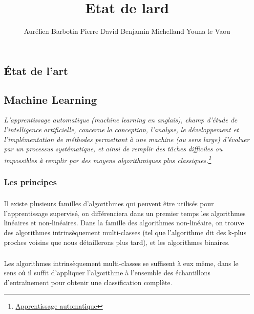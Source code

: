 \documentclass[a4paper,10pt]{report}
\begin{document}
\begin{multicols}{2}
\title{Etat de lard}
\author{Aurélien Barbotin Pierre David Benjamin Michelland Youna le Vaou}

\maketitle
\chapter{État de l'art}

\section{Machine Learning}
\textit{L'apprentissage automatique (machine learning en anglais), champ d'étude de l'intelligence artificielle, concerne la conception, l'analyse, le développement et l'implémentation de méthodes permettant à une machine (au sens large) d'évoluer par un processus systématique, et ainsi de remplir des tâches difficiles ou impossibles à remplir par des moyens algorithmiques plus classiques.\footnote{\href{https://fr.wikipedia.org/wiki/Apprentissage_automatique}{Apprentissage automatique}}}
\subsection{Les principes}
\paragraph{}
Il existe plusieurs familles d'algorithmes qui peuvent être utilisés pour l'apprentissage supervisé, on différenciera dans un premier temps les algorithmes linéaires et non-linéaires. Dans la famille des algorithmes non-linéaire, on trouve des algorithmes intrinsèquement multi-classes (tel que l'algorithme dit des k-plus proches voisins que nous détaillerons plus tard), et les algorithmes binaires.

\paragraph{}
Les algorithmes intrinsèquement multi-classes se suffisent à eux même, dans le sens où il suffit d'appliquer l'algorithme à l'ensemble des échantillons d'entraînement pour obtenir une classification complète.

\end{multicols}
\end{document}
